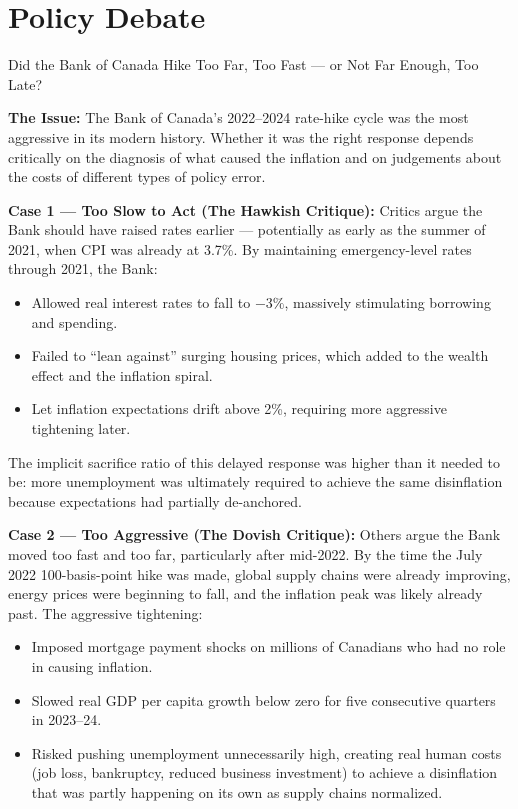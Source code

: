 \section*{Policy Debate}

\begin{policydebate}{Did the Bank of Canada Hike Too Far, Too Fast --- or Not Far Enough, Too Late?}

\textbf{The Issue:} The Bank of Canada's 2022--2024 rate-hike cycle was
the most aggressive in its modern history. Whether it was the right response
depends critically on the diagnosis of what caused the inflation and on
judgements about the costs of different types of policy error.

\textbf{Case 1 --- Too Slow to Act (The Hawkish Critique):}
Critics argue the Bank should have raised rates earlier --- potentially
as early as the summer of 2021, when CPI was already at 3.7\%. By
maintaining emergency-level rates through 2021, the Bank:
\begin{itemize}
  \item Allowed real interest rates to fall to $-3\%$, massively stimulating
        borrowing and spending.
  \item Failed to ``lean against'' surging housing prices, which added
        to the wealth effect and the inflation spiral.
  \item Let inflation expectations drift above 2\%, requiring more
        aggressive tightening later.
\end{itemize}
The implicit sacrifice ratio of this delayed response was higher than
it needed to be: more unemployment was ultimately required to achieve
the same disinflation because expectations had partially de-anchored.

\textbf{Case 2 --- Too Aggressive (The Dovish Critique):}
Others argue the Bank moved too fast and too far, particularly after
mid-2022. By the time the July 2022 100-basis-point hike was made,
global supply chains were already improving, energy prices were
beginning to fall, and the inflation peak was likely already past.
The aggressive tightening:
\begin{itemize}
  \item Imposed mortgage payment shocks on millions of Canadians who had
        no role in causing inflation.
  \item Slowed real GDP per capita growth below zero for five consecutive
        quarters in 2023--24.
  \item Risked pushing unemployment unnecessarily high, creating real
        human costs (job loss, bankruptcy, reduced business investment)
        to achieve a disinflation that was partly happening on its own
        as supply chains normalized.
\end{itemize}


\end{policydebate}
